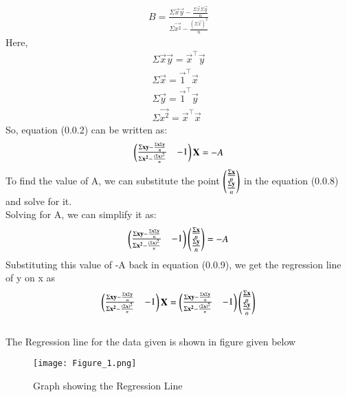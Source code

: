 \documentclass[journal,12pt,twocolumn]{IEEEtran}
\begin{document}
\begin{align}
    B = \frac{\Sigma \vec{x}\vec{y} - \frac{\Sigma \vec{x} \Sigma \vec{y}}{n}}{\Sigma \vec{x^2} - \frac{(\Sigma \vec{x})^2}{n}}
\end{align}
Here,\\
\begin{align}
    \Sigma \vec{x}\vec{y} = \vec{x}^{\top}\vec{y}\\
    \Sigma \vec{x} = \vec{1}^{\top}\vec{x}\\
    \Sigma \vec{y} = \vec{1}^{\top}\vec{y}\\
    \Sigma \vec{x^2} = \vec{x}^{\top}\vec{x}
\end{align}
So, equation (0.0.2) can be written as:\\
\begin{align}
    \begin{pmatrix}\frac{\Sigma \mathbf{x}\mathbf{y} - \frac{\Sigma \mathbf{x} \Sigma \mathbf{y}}{n}}{\Sigma \mathbf{x^2} - \frac{(\Sigma \mathbf{x})^2}{n}} & -1\end{pmatrix}\mathbf{X} = -A
\end{align}
To find the value of A, we can substitute the point $ \begin{pmatrix}\frac{\Sigma \mathbf{x}}{n} \\ \frac{\Sigma \mathbf{y}}{n}\end{pmatrix}  $ in the equation (0.0.8) and solve for it.\\
Solving for A, we can simplify it as:\\
\begin{align}
    \begin{pmatrix}\frac{\Sigma \mathbf{x}\mathbf{y} - \frac{\Sigma \mathbf{x} \Sigma \mathbf{y}}{n}}{\Sigma \mathbf{x^2} - \frac{(\Sigma \mathbf{x})^2}{n}} & -1\end{pmatrix}\begin{pmatrix}\frac{\Sigma \mathbf{x}}{n} \\ \frac{\Sigma \mathbf{y}}{n}\end{pmatrix} = -A
\end{align}
Substituting this value of -A back in equation (0.0.9), we get the regression line of y on x as\\
\begin{align}
    \begin{pmatrix}\frac{\Sigma \mathbf{x}\mathbf{y} - \frac{\Sigma \mathbf{x} \Sigma \mathbf{y}}{n}}{\Sigma \mathbf{x^2} - \frac{(\Sigma \mathbf{x})^2}{n}} & -1\end{pmatrix}\mathbf{X} = \begin{pmatrix}\frac{\Sigma \mathbf{x}\mathbf{y} - \frac{\Sigma \mathbf{x} \Sigma \mathbf{y}}{n}}{\Sigma \mathbf{x^2} - \frac{(\Sigma \mathbf{x})^2}{n}} & -1\end{pmatrix}\begin{pmatrix}\frac{\Sigma \mathbf{x}}{n} \\ \frac{\Sigma \mathbf{y}}{n}\end{pmatrix}
\end{align}\\
The Regression line for the data given is shown in figure given below
\begin{figure}[ht]
    \centering
    \texttt{[image: Figure\_1.png]}
    \caption{Graph showing the Regression Line}
    \label{Figure_1}
\end{figure}\\
\end{document}
